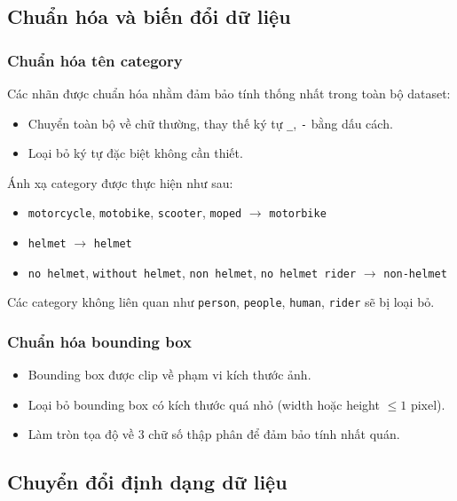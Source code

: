 \subsection{Chuẩn hóa và biến đổi dữ liệu}

\subsubsection{Chuẩn hóa tên category}

Các nhãn được chuẩn hóa nhằm đảm bảo tính thống nhất trong toàn bộ dataset:

\begin{itemize}
    \item Chuyển toàn bộ về chữ thường, thay thế ký tự \texttt{\_}, \texttt{-} bằng dấu cách.
    \item Loại bỏ ký tự đặc biệt không cần thiết.
\end{itemize}

Ánh xạ category được thực hiện như sau:

\begin{itemize}
    \item \texttt{motorcycle}, \texttt{motobike}, \texttt{scooter}, \texttt{moped} $\rightarrow$ \texttt{motorbike}
    \item \texttt{helmet} $\rightarrow$ \texttt{helmet}
    \item \texttt{no helmet}, \texttt{without helmet}, \texttt{non helmet}, \texttt{no helmet rider} $\rightarrow$ \texttt{non-helmet}
\end{itemize}

Các category không liên quan như \texttt{person}, \texttt{people}, \texttt{human}, \texttt{rider} sẽ bị loại bỏ.

\subsubsection{Chuẩn hóa bounding box}

\begin{itemize}
    \item Bounding box được clip về phạm vi kích thước ảnh.
    \item Loại bỏ bounding box có kích thước quá nhỏ (width hoặc height $\leq 1$ pixel).
    \item Làm tròn tọa độ về 3 chữ số thập phân để đảm bảo tính nhất quán.
\end{itemize}

\subsection{Chuyển đổi định dạng dữ liệu}

